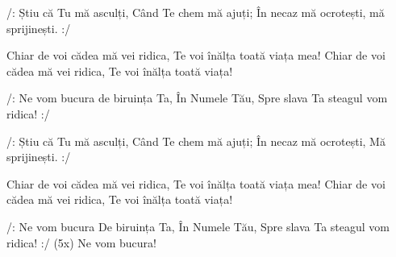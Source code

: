 \beginverse
/: Știu că Tu mă asculți,
Când Te chem mă ajuți;
În necaz mă ocrotești, mă sprijinești. :/
\endverse

\beginchorus
Chiar de voi cădea mă vei ridica,
Te voi înălța toată viața mea!
Chiar de voi cădea mă vei ridica,
Te voi înălța toată viața!
\endchorus

\beginchorus
/: Ne vom bucura de biruința Ta,
În Numele Tău,
Spre slava Ta steagul vom ridica! :/
\endchorus

\beginverse
/: Știu că Tu mă asculți,
Când Te chem mă ajuți;
În necaz mă ocrotești,
Mă sprijinești. :/
\endverse

\beginchorus
Chiar de voi cădea mă vei ridica,
Te voi înălța toată viața mea!
Chiar de voi cădea mă vei ridica,
Te voi înălța toată viața!
\endchorus

\beginchorus
/: Ne vom bucura
De biruința Ta,
În Numele Tău,
Spre slava Ta steagul vom ridica! :/ (5x)
Ne vom bucura!
\endchorus
\endsong